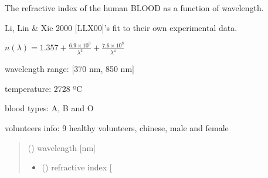 \documentclass[letterpaper,10pt,english]{sphinxmanual}
\begin{document}

\begin{fulllineitems}
\label{\detokenize{05_refractive_index:skinoptics.refractive_index.n_blo_Li}}
\pysigstartsignatures
{}
\pysigstopsignatures
\begin{DUlineblock}{0em}
\item[] The refractive index of the human BLOOD as a function of wavelength.
\item[] Li, Lin \& Xie 2000 {[}LLX00{]}’s fit to their own experimental data.
\end{DUlineblock}

\sphinxAtStartPar
\(n(\lambda) = 1.357 + \frac{6.9 \times 10^3}{\lambda^2} + \frac{7.6 \times 10^8}{\lambda^4}\)

\begin{DUlineblock}{0em}
\item[] wavelength range: {[}370 nm, 850 nm{]}
\item[] temperature: 27\sphinxhyphen{}28 ºC
\item[] blood types: A, B and O
\item[] volunteers info: 9 healthy volunteers, chinese, male and female
\end{DUlineblock}
\begin{quote}\begin{description}
\sphinxAtStartPar
{} () \textendash{} wavelength {[}nm{]}

\sphinxAtStartPar
\begin{itemize}
\item {} 
\sphinxAtStartPar
{} () \textendash{} refractive index {[}\sphinxhyphen{}{]}

\end{itemize}


\end{description}\end{quote}

\end{fulllineitems}
\end{document}
